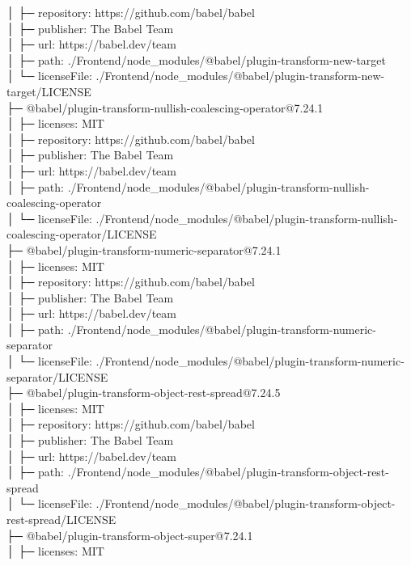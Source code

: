 │  ├─ repository: https://github.com/babel/babel\\
│  ├─ publisher: The Babel Team\\
│  ├─ url: https://babel.dev/team\\
│  ├─ path: ./Frontend/node\_modules/@babel/plugin-transform-new-target\\
│  └─ licenseFile: ./Frontend/node\_modules/@babel/plugin-transform-new-target/LICENSE\\
├─ @babel/plugin-transform-nullish-coalescing-operator@7.24.1\\
│  ├─ licenses: MIT\\
│  ├─ repository: https://github.com/babel/babel\\
│  ├─ publisher: The Babel Team\\
│  ├─ url: https://babel.dev/team\\
│  ├─ path: ./Frontend/node\_modules/@babel/plugin-transform-nullish-coalescing-operator\\
│  └─ licenseFile: ./Frontend/node\_modules/@babel/plugin-transform-nullish-coalescing-operator/LICENSE\\
├─ @babel/plugin-transform-numeric-separator@7.24.1\\
│  ├─ licenses: MIT\\
│  ├─ repository: https://github.com/babel/babel\\
│  ├─ publisher: The Babel Team\\
│  ├─ url: https://babel.dev/team\\
│  ├─ path: ./Frontend/node\_modules/@babel/plugin-transform-numeric-separator\\
│  └─ licenseFile: ./Frontend/node\_modules/@babel/plugin-transform-numeric-separator/LICENSE\\
├─ @babel/plugin-transform-object-rest-spread@7.24.5\\
│  ├─ licenses: MIT\\
│  ├─ repository: https://github.com/babel/babel\\
│  ├─ publisher: The Babel Team\\
│  ├─ url: https://babel.dev/team\\
│  ├─ path: ./Frontend/node\_modules/@babel/plugin-transform-object-rest-spread\\
│  └─ licenseFile: ./Frontend/node\_modules/@babel/plugin-transform-object-rest-spread/LICENSE\\
├─ @babel/plugin-transform-object-super@7.24.1\\
│  ├─ licenses: MIT\\
